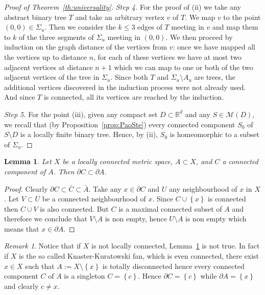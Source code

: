 \documentclass{amsart}
\newcommand{\RR}{\mathbb R}
\newcommand{\ENCLOSE}[1]{\left\{#1\right\}}
\newcommand{\M}{\mathcal{M}}
\newtheorem{lemma}[theorem]{Lemma}
\theoremstyle{definition}
\theoremstyle{remark}
\newtheorem{remark}[theorem]{Remark}
\begin{document}
\begin{proof}[Proof of Theorem~\ref{th:universality}]
\emph{Step 4.} For the proof of (ii) we take any abstract binary tree $T$ and take an arbitrary 
vertex $v$ of $T$.
We map $v$ to the point $(0,0)\in \Sigma_u$. 
Then we consider the $k\le 3$ edges of $T$ meeting in $v$ and map them 
to $k$ of the three segments of $\Sigma_u$ meeting in $(0,0)$. 
We then proceed by induction on the graph distance of the vertices from $v$: once 
we have mapped all the vertices up to distance $n$, for each of these vertices 
we have at most two adjacent vertices at distance $n+1$ which we can map to one or both of the two 
adjacent vertices of the tree in $\Sigma_u$.
Since both $T$ and $\Sigma_u\setminus A_u$ are trees, 
the additional vertices discovered in the induction process were not already used.
And since $T$ is connected, all its vertices are reached by the induction.

\emph{Step 5.} For the point (iii), given any compact set $D\subset \RR^d$ and any $S\in \M(D)$,
we recall that (by Proposition~\ref{prop:PaoSte}) every connected component $S_0$ 
of $S\setminus D$ is a locally finite binary tree. 
Hence, by (ii), $S_0$ is homeomorphic to a subset of $\Sigma_u$.
\end{proof}

\begin{lemma}\label{lemma_da_fare}
Let $X$ be a locally connected metric space, $A\subset X$, and 
$C$ a connected component of $A$. Then $\partial C \subset \partial A$.
\end{lemma}
\begin{proof}
Clearly $\partial C\subset \bar C\subset \bar A$.
Take any $x\in \partial C$ and $U$ any neighbourhood of $x$ in $X$.
Let $V\subset U$ be a connected neighbourhood of $x$.
Since $C\cup\ENCLOSE{x}$ is connected 
then $C\cup V$ is also connected. But $C$ is a maximal connected subset of $A$ 
and therefore we conclude that $V\setminus A$ is non empty, hence $U\setminus A$ is non empty 
which means that $x\in \partial A$.
\end{proof}

\begin{remark}
Notice that if $X$ is not locally connected, Lemma~\ref{lemma_da_fare} is not true.
In fact if $X$ is the so called Knaster-Kuratowski fan, which is even connected, 
there exist $x\in X$ such that $A:= X\setminus\ENCLOSE{x}$ is totally disconnected hence
every connected component $C$ of $A$ is a singleton $C=\ENCLOSE{c}$.
Hence $\partial C = \ENCLOSE{c}$ while $\partial A = \ENCLOSE{x}$ and clearly $c\neq x$.
\end{remark}
\end{document}

